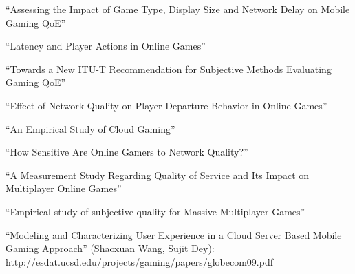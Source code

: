``Assessing the Impact of Game Type, Display Size and Network Delay on Mobile Gaming QoE'' \cite{beyer2014typedisplaydelayimpact}

``Latency and Player Actions in Online Games'' \cite{Claypool:2006:LPA:1167838.1167860}





``Towards a New {ITU-T} Recommendation for Subjective Methods Evaluating Gaming {QoE}'' \cite{mollertowards}

``Effect of Network Quality on Player Departure Behavior in Online Games'' \cite{4591393}

``An Empirical Study of Cloud Gaming'' \cite{Manzano:2012:ESC:2501560.2501582}


``How Sensitive Are Online Gamers to Network Quality?'' \cite{Chen:2006:SOG:1167838.1167859}

``A Measurement Study Regarding Quality of Service and Its Impact on Multiplayer Online Games'' \cite{Bredel:2010:MSR:1944796.1944797}

``Empirical study of subjective quality for Massive Multiplayer Games'' \cite{4604397}



``Modeling and Characterizing User Experience in a Cloud Server Based Mobile Gaming Approach'' (Shaoxuan Wang, Sujit Dey): http://esdat.ucsd.edu/projects/gaming/papers/globecom09.pdf

